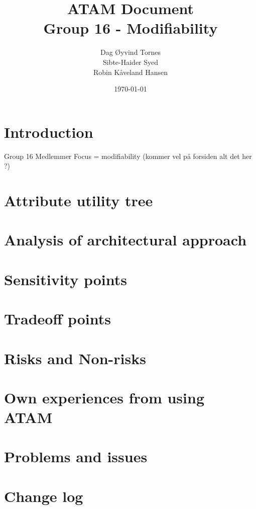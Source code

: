 \documentclass[titlepage,a4paper,10pt]{article}
\date{\today}
\begin{document}
\title{ATAM Document\\
 		Group 16 - Modifiability}

\author{Dag Øyvind Tornes\\
 		Sibte-Haider Syed\\ 
		Robin Kåveland Hansen\\}
\maketitle

\pagestyle{empty}
\tableofcontents
\clearpage
\pagestyle{plain}

\section{Introduction}
Group 16
Medlemmer
Focus = modifiability (kommer vel på forsiden alt det her ?)

\section{Attribute utility tree}


\section{Analysis of architectural approach}


\section{Sensitivity points}


\section{Tradeoff points}


\section{Risks and Non-risks}


\section{Own experiences from using ATAM}


\section{Problems and issues}


\section{Change log}

\end{document}
